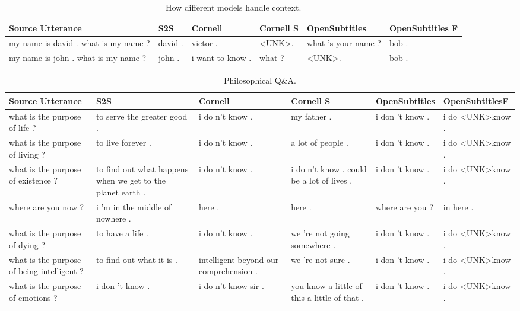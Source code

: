 \documentclass[12pt]{article}
\begin{document}
\begin{table}[H]
	\centering
	\begin{tabular}{|L{2.3cm}|L{2.3cm}|L{2.3cm}|L{2.3cm}|L{2.3cm}|L{2.3cm}|}
		\hline
		\textbf{Source Utterance} & \textbf{S2S} & \textbf{Cornell} & \textbf{Cornell S} & \textbf{OpenSubtitles} & \textbf{OpenSubtitles F}\\ \hline
		my name is david . what is my name ? & david . & victor . & \textless UNK\textgreater . & what 's your name ? & bob .
		\\ \hline
		my name is john . what is my name ? & john . & i want to know . & what ? & \textless UNK\textgreater . & bob .
		\\ \hline
		
	\end{tabular}
	\caption{How different models handle context.}	
	\label{table:contextNCM}
\end{table}
\begin{table}[H]
	\centering
	\begin{tabular}{|L{2.3cm}|L{2.3cm}|L{2.3cm}|L{2.3cm}|L{2.3cm}|L{2.3cm}|}
		\hline
		\textbf{Source Utterance} & \textbf{S2S} & \textbf{Cornell} & \textbf{Cornell S} & \textbf{OpenSubtitles} & \textbf{OpenSubtitlesF}\\ \hline
		what is the purpose of life ? & to serve the greater good . & i do n't know . & my father . & i don 't know . & i do \textless UNK\textgreater know .
		\\ \hline
		what is the purpose of living ? & to live forever . & i do n't know . & a lot of people . & i don 't know . & i do \textless UNK\textgreater know .
		\\ \hline
		what is the purpose of existence ? & to find out what happens when we get to the planet earth . & i do n't know . & i do n't know . could be a lot of lives . & i don 't know . & i do \textless UNK\textgreater know .
		\\ \hline
		where are you now ? & i ’m in the middle of nowhere . & here . & here . & where are you ? & in here .
		\\ \hline
		what is the purpose of dying ? & to have a life . & i do n't know . & we 're not going somewhere . & i don 't know . & i do \textless UNK\textgreater know .
		\\ \hline
		what is the purpose of being intelligent ? & to find out what it is . & intelligent beyond our comprehension .  & we 're not sure . & i don 't know . & i do \textless UNK\textgreater know .
		\\ \hline
		what is the purpose of emotions ? & i don ’t know . & i do n't know sir .  & you know a little of this a little of that . & i don 't know . & i do \textless UNK\textgreater know .
		\\ \hline
		
	\end{tabular}
	\caption{Philosophical Q\&A.}	
	\label{table:philosophicalNCM}
\end{table}
\end{document}
